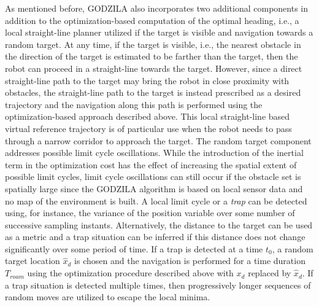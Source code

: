 \documentclass[10pt,conference]{ieeeconf}
\begin{document}
As mentioned before, GODZILA also incorporates two additional components in
addition to the optimization-based computation of the optimal heading, i.e.,
a local straight-line planner utilized if the target is visible
and  navigation towards a random target.
At any time, if the target is visible, i.e., the nearest obstacle in
the direction of the target is estimated to be farther than the target, then the
robot can proceed in a straight-line towards the target.  
However, since a
direct straight-line path to the target may bring the robot in close proximity
with obstacles, the straight-line path
to the target is instead prescribed as a desired trajectory and the navigation along this path
is performed using the optimization-based approach described above. This local
straight-line based virtual reference trajectory is of particular use when
the robot needs to pass through a narrow corridor to approach the target.
The random target component addresses possible limit cycle oscillations. While the introduction of the inertial term in the
optimization cost has the effect of increasing the spatial extent of
possible limit cycles, limit cycle oscillations can still occur if the obstacle set is spatially
large since the GODZILA algorithm is
based on local sensor data and no map of the environment is built.
A local limit cycle or a {\em trap} can be detected using, for
instance, the variance of the position variable over some number of
successive sampling instants.  Alternatively, the distance to the
target can be used as a metric and a trap situation can be inferred if
this distance does not change significantly over some period of time.
If a trap is detected at a time $t_0$, a random target location $\hat x_d$ is
chosen and the navigation is performed for a time duration $T_{roam}$ using the optimization procedure
described above with $x_d$ replaced by $\hat x_d$.  
If a trap situation is detected multiple times, then progressively longer
sequences of
random moves are utilized to escape the local minima.
\end{document}
